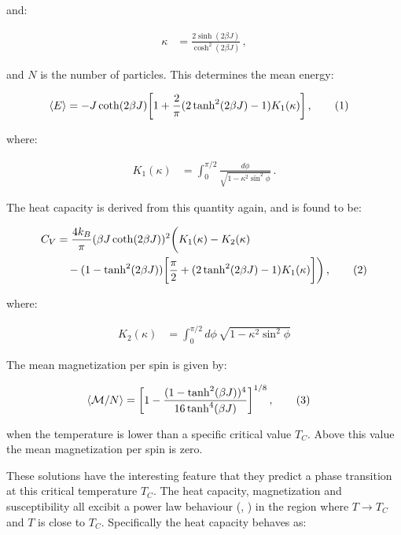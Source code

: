 \documentclass[reprint,english,notitlepage]{revtex4-1}  %
\newcommand\numberthis{\addtocounter{equation}{1}\tag{\theequation}}
\begin{document}
and:

\begin{align*}
\kappa &= \frac{2\sinh ( 2\beta J) }{\cosh^2(2\beta J)} \, ,
\end{align*}

and $N$ is the number of particles. This determines the mean energy:

\begin{align*}
\langle E \rangle &= -J \coth( 2\beta J) \bigg[ 1 + \frac{2}{\pi} (2\tanh^2 (2\beta J) - 1) K_1(\kappa) \bigg] \, , \numberthis \label{eq:LO_energy}
\end{align*}

where:

\begin{align*}
K_1 (\kappa) &= \int_0^{\pi/2} \frac{d\phi}{\sqrt{1 - \kappa^2 \sin^2 \phi}} \, .
\end{align*}

The heat capacity is derived from this quantity again, and is found to be:

\begin{align*}
C_V &= \frac{4k_B}{\pi} (\beta J \coth(2\beta J))^2 \bigg( K_1(\kappa) - K_2(\kappa) \\ 
& \quad - (1 - \tanh^2 (2\beta J) ) \bigg[ \frac{\pi}{2} + (2\tanh^2 (2\beta J) - 1)K_1(\kappa) \bigg] \bigg) \, , \numberthis \label{eq:LO_heat_capacity}
\end{align*}

where:

\begin{align*}
K_2(\kappa) &= \int_0^{\pi/2} d\phi \, \sqrt{1 - \kappa^2 \sin^2 \phi}
\end{align*}

The mean magnetization per spin is given by:

\begin{align*}
\langle \mathcal{M} / N \rangle &= \bigg[1 - \frac{(1- \tanh^2 (\beta J) )^4}{16\tanh^4 (\beta J)} \bigg]^{1/8} \, , \numberthis \label{eq:LO_magnetization_per_spin}
\end{align*}

when the temperature is lower than a specific critical value $T_C$. Above this value the mean magnetization per spin is zero.

These solutions have the interesting feature that they predict a phase transition at this critical temperature $T_C$. The heat capacity, magnetization and susceptibility all excibit a power law behaviour (\citep{Stanley1999}, \cite[chapter 2.1.2]{landau_binder_2014}) in the region where $T\to T_C$ and $T$ is close to $T_C$. Specifically the heat capacity behaves as:
\end{document}
